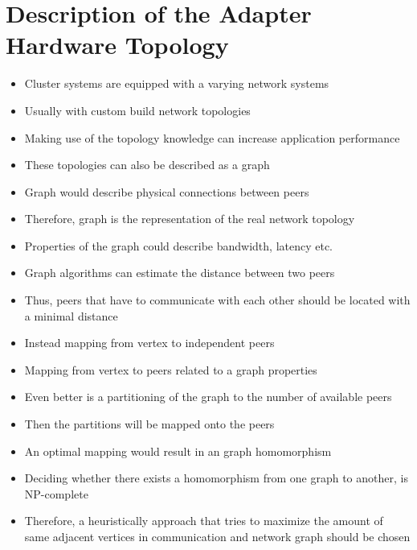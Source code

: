 \section*{Description of the Adapter Hardware Topology}
\begin{itemize}

\item Cluster systems are equipped with a varying network systems
\item Usually with custom build network topologies
\item Making use of the topology knowledge can increase application
  performance
\item These topologies can also be described as a graph
\item Graph would describe physical connections between peers
\item Therefore, graph is the representation of the real network
  topology
\item Properties of the graph could describe bandwidth, latency etc.
\item Graph algorithms can estimate the distance between two peers
\item Thus, peers that have to communicate with each other should be
  located with a minimal distance

\item Instead mapping from vertex to independent peers
\item Mapping from vertex to peers related to a graph properties
\item Even better is a partitioning of the graph to the number of
  available peers
\item Then the partitions will be mapped onto the peers
\item An optimal mapping would result in an graph homomorphism
\item Deciding whether there exists a homomorphism from one graph to
  another, is NP-complete
\item Therefore, a heuristically approach that tries to maximize the
  amount of same adjacent vertices in communication and network graph
  should be chosen


\end{itemize}
